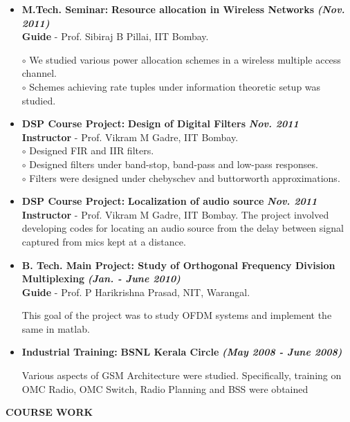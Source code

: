 \documentclass[a4paper,10pt]{article}
\begin{document}
\begin{itemize}
 \item \textbf{M.Tech. Seminar:} \textbf{Resource allocation in Wireless Networks}  \textbf \emph{(Nov. 2011)}\\
        {\textbf{Guide} - Prof. Sibiraj B Pillai, IIT Bombay.   }          %

      $\circ$ We studied various power allocation schemes in a wireless multiple access channel. \\
      $\circ$ Schemes achieving rate tuples under information theoretic setup was studied.
       
 \item \textbf{DSP Course Project:} \textbf{Design of Digital Filters} \textbf \emph{Nov. 2011}\\
	{\textbf{Instructor} - Prof. Vikram M Gadre, IIT Bombay. } \\
	$\circ$ Designed FIR and IIR filters. \\
	$\circ$ Designed filters under band-stop, band-pass and low-pass responses. \\
	$\circ$ Filters were designed under chebyschev and buttorworth approximations.
	
 \item \textbf{DSP Course Project:} \textbf{Localization of audio source} \textbf \emph{Nov. 2011}\\
	{\textbf{Instructor} - Prof. Vikram M Gadre, IIT Bombay. }
	The project involved developing codes for locating an audio source from the delay between signal captured from 
	mics kept at a distance.

  \item \textbf{{B. Tech. Main Project}: Study of Orthogonal Frequency Division Multiplexing}  \textbf \emph{(Jan. - June 2010)}\\
        {\textbf{Guide} - Prof. P Harikrishna Prasad, NIT, Warangal. }

This goal of the project was to study OFDM systems and implement the same in matlab.

  \item \textbf{Industrial Training:} \textbf{BSNL Kerala Circle}  \textbf \emph{(May 2008 - June 2008)}        

  Various aspects of GSM Architecture were studied. Specifically, training on OMC Radio, OMC Switch, Radio Planning and BSS were 
  obtained

 \end{itemize}

 \colorbox{titleColor}{\parbox{6.5in}{\textbf{COURSE WORK}}}
\end{document}
